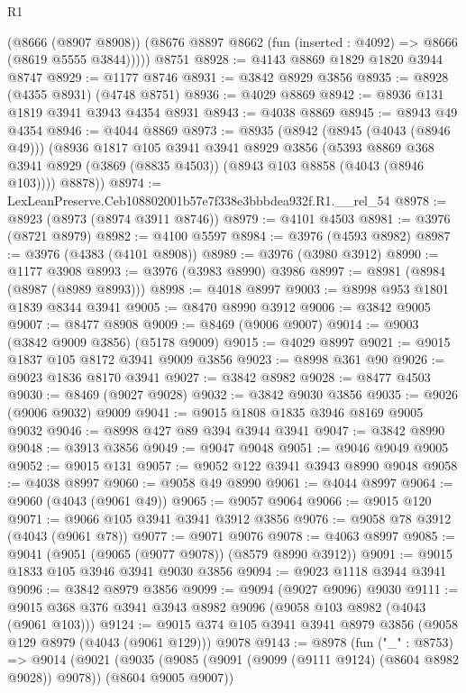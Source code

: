 \begin{lexlean}{R1}
\begin{coremodule}
        (@8666 (@8907 @8908))
        (@8676 @8897 @8662 (fun (inserted : @4092) => @8666 (@8619 @5555 @3844)))))
    @8751
@8928 := @4143 @8869 @1829 @1820 @3944 @8747
@8929 := @1177 @8746
@8931 := @3842 @8929 @3856
@8935 := @8928 (@4355 @8931) (@4748 @8751)
@8936 := @4029 @8869
@8942 := @8936 @131 @1819 @3941 @3943 @4354 @8931
@8943 := @4038 @8869
@8945 := @8943 @49 @4354
@8946 := @4044 @8869
@8973 := @8935
    (@8942
      (@8945 (@4043 (@8946 @49)))
      (@8936
        @1817
        @105
        @3941
        @3941
        @8929
        @3856
        (@5393 @8869 @368 @3941 @8929 (@3869 (@8835 @4503)) (@8943 @103 @8858 (@4043 (@8946 @103))))
        @8878))
@8974 := LexLeanPreserve.Ceb108802001b57e7f338e3bbbdea932f.R1.__rel_54
@8978 := @8923 (@8973 (@8974 @3911 @8746))
@8979 := @4101 @4503
@8981 := @3976 (@8721 @8979)
@8982 := @4100 @5597
@8984 := @3976 (@4593 @8982)
@8987 := @3976 (@4383 (@4101 @8908))
@8989 := @3976 (@3980 @3912)
@8990 := @1177 @3908
@8993 := @3976 (@3983 @8990) @3986
@8997 := @8981 (@8984 (@8987 (@8989 @8993)))
@8998 := @4018 @8997
@9003 := @8998 @953 @1801 @1839 @8344 @3941
@9005 := @8470 @8990 @3912
@9006 := @3842 @9005
@9007 := @8477 @8908
@9009 := @8469 (@9006 @9007)
@9014 := @9003 (@3842 @9009 @3856) (@5178 @9009)
@9015 := @4029 @8997
@9021 := @9015 @1837 @105 @8172 @3941 @9009 @3856
@9023 := @8998 @361 @90
@9026 := @9023 @1836 @8170 @3941
@9027 := @3842 @8982
@9028 := @8477 @4503
@9030 := @8469 (@9027 @9028)
@9032 := @3842 @9030 @3856
@9035 := @9026 (@9006 @9032) @9009
@9041 := @9015 @1808 @1835 @3946 @8169 @9005 @9032
@9046 := @8998 @427 @89 @394 @3944 @3941
@9047 := @3842 @8990
@9048 := @3913 @3856
@9049 := @9047 @9048
@9051 := @9046 @9049 @9005
@9052 := @9015 @131
@9057 := @9052 @122 @3941 @3943 @8990 @9048
@9058 := @4038 @8997
@9060 := @9058 @49 @8990
@9061 := @4044 @8997
@9064 := @9060 (@4043 (@9061 @49))
@9065 := @9057 @9064
@9066 := @9015 @120
@9071 := @9066 @105 @3941 @3941 @3912 @3856
@9076 := @9058 @78 @3912 (@4043 (@9061 @78))
@9077 := @9071 @9076
@9078 := @4063 @8997
@9085 := @9041 (@9051 (@9065 (@9077 @9078)) (@8579 @8990 @3912))
@9091 := @9015 @1833 @105 @3946 @3941 @9030 @3856
@9094 := @9023 @1118 @3944 @3941
@9096 := @3842 @8979 @3856
@9099 := @9094 (@9027 @9096) @9030
@9111 := @9015 @368 @376 @3941 @3943 @8982 @9096 (@9058 @103 @8982 (@4043 (@9061 @103)))
@9124 := @9015 @374 @105 @3941 @3941 @8979 @3856 (@9058 @129 @8979 (@4043 (@9061 @129))) @9078
@9143 := @8978
    (fun ("_" : @8753) =>
    @9014
      (@9021
        (@9035 (@9085 (@9091 (@9099 (@9111 @9124) (@8604 @8982 @9028)) @9078)) (@8604 @9005 @9007))

\end{coremodule}
\end{lexlean}
